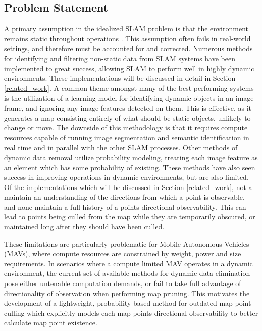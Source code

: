 \subsection{Problem Statement}


A primary assumption in the idealized SLAM problem is that the environment remains static throughout operations \cite{PLACEHOLDER}. This assumption often fails in real-world settings, and therefore must be accounted for and corrected. Numerous methods for identifying and filtering non-static data from SLAM systems have been implemented to great success, allowing SLAM to perform well in highly dynamic environments. These implementations will be discussed in detail in Section \ref{related_work}. A common theme amongst many of the best performing systems is the utilization of a learning model for identifying dynamic objects in an image frame, and ignoring any image features detected on them. This is effective, as it generates a map consisting entirely of what should be static objects, unlikely to change or move. The downside of this methodology is that it requires compute resources capable of running image segmentation and semantic identification in real time and in parallel with the other SLAM processes. Other methods of dynamic data removal utilize probability modeling, treating each image feature as an element which has some probability of existing. These methods have also seen success in improving operations in dynamic environments, but are also limited. Of the implementations which will be discussed in Section \ref{related_work}, not all maintain an understanding of the directions from which a point is observable, and none maintain a full history of a points directional observability. This can lead to points being culled from the map while they are temporarily obscured, or maintained long after they should have been culled.

These limitations are particularly problematic for Mobile Autonomous Vehicles (MAVs), where compute resources are constrained by weight, power and size requirements. In scenarios where a compute limited MAV operates in a dynamic environment, the current set of available methods for dynamic data elimination pose either untenable computation demands, or fail to take full advantage of directionality of observation when performing map pruning. This motivates the development of a lightweight, probability based method for outdated map point culling which explicitly models each map points directional observability to better calculate map point existence.

